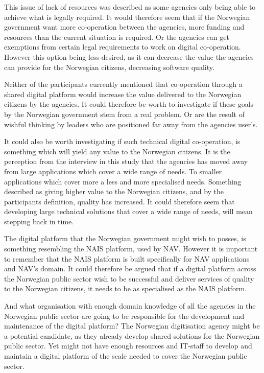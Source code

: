 This issue of lack of resources was described as some agencies only being able to achieve what is legally required. It would therefore seem that if the Norwegian government want more co-operation between the agencies, more funding and resources than the current situation is required. Or the agencies can get exemptions from certain legal requirements to work on digital co-operation. However this option being less desired, as it can decrease the value the agencies can provide for the Norwegian citizens, decreasing software quality.

Neither of the participants currently mentioned that co-operation through a shared digital platform would increase the value delivered to the Norwegian citizens by the agencies. It could therefore be worth to investigate if these goals by the Norwegian government stem from a real problem. Or are the result of wishful thinking by leaders who are positioned far away from the agencies user's. 

It could also be worth investigating if such technical digital co-operation, is something which will yield any value to the Norwegian citizens. It is the perception from the interview in this study that the agencies has moved away from large applications which cover a wide range of needs. To smaller applications which cover more a less and more specialised needs. Something described as giving higher value to the Norwegian citizens, and by the participants definition, quality has increased. It could therefore seem that developing large technical solutions that cover a wide range of needs, will mean stepping back in time.

The digital platform that the Norwegian government might wish to posses, is something resembling the NAIS platform, used by NAV. However it is important to remember that the NAIS platform is built specifically for NAV applications and NAV's domain. It could therefore be argued that if a digital platform across the Norwegian public sector wish to be successful and deliver services of quality to the Norwegian citizens, it needs to be as specialised as the NAIS platform. 

And what organisation with enough domain knowledge of all the agencies in the Norwegian public sector are going to be responsible for the development and maintenance of the digital platform? The Norwegian digitisation agency might be a potential candidate, as they already develop shared solutions for the Norwegian public sector. Yet might not have enough resources and IT-staff to develop and maintain a digital platform of the scale needed to cover the Norwegian public sector. 

